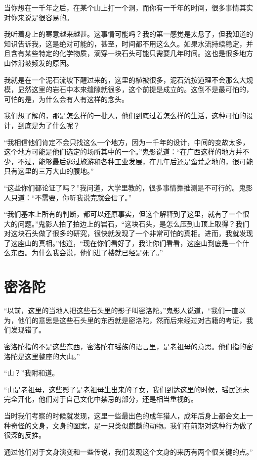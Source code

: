 当你想在一千年之后，在某个山上打一个洞，而你有一千年的时间，很多事情其实对你来说是很容易的。

我听着身上的寒意越来越甚。这事情可能吗？我的第一感觉是太悬了，但我知道的知识告诉我，这是绝对可能的，甚至，时间都不用这么久。如果水流持续稳定，并且含有某些特定的化学物质，滴穿一块石头可能只需要几年时间。这也是很多地方山体滑坡频发的原因。

我就是在一个泥石流坡下醒过来的，这里的植被很多，泥石流按道理不会那么大规模，显然这里的岩石中本来缝隙就很多，这个前提是成立的。这倒不是最可怕的，可怕的是，为什么会有人有这样的念头。

我们想了解的，那是怎么样的一批人，他们到底过着怎么样的生活，这种可怕的设计，到底是为了什么呢？

“我相信他们肯定不会只找这么一个地方，因为一千年的设计，中间的变故太多，这个地方可能是他们选定的场所其中的一个。”鬼影说道：“在广西这样的地方并不少，不过，能够最后逃过旅游和各种工业发展，在几年后还是蛮荒之地的，很可能只有这里的三万大山的腹地。”

“这些你们都论证了吗？”我问道，大学里教的，很多事情靠推测是不可行的。鬼影人只道：“不需要，你听我说完就会信了。”

“我们基本上所有的判断，都可以还原事实，但这个解释到了这里，就有了一个很大的问题。”鬼影人拍了拍边上的岩石，“这块石头，是怎么压到山顶上取得？我们对这块石头做了很多的研究，很快就发现了一个非常可怕的真相。进而，我就发现了这座山的真相。”他道，“现在你们看好了，我让你们看看，这座山到底是一个什么东西。为什么我会说，他们进了楼就已经是死了。”

\chapter{密洛陀}

“以前，这里的当地人把这些石头里的影子叫密洛陀。”鬼影人说道，“我们一直以为，他们的意思是这些石头里的东西就是密洛陀，然而后来经过对古籍的考证，我们发现错了。

密洛陀指的不是这些东西，密洛陀在瑶族的语言里，是老祖母的意思。他们指的密洛陀是这里整座的大山。”

“山？”我附和道。

“山是老祖母，这些影子是老祖母生出来的子女，我们到达这里的时候，瑶民还未完全开化，他们对于自己文化中禁忌的部分，还是相当重视的。

当时我们考察的时候就发现，这里一些最出色的成年猎人，成年后身上都会文上一种奇怪的文身，文身的图案，是一只类似麒麟的动物。我们在前期对这种行为做了很深的反推。

通过他们对于文身演变和一些传说，我们发现这个文身的来历有两个很关键的点。”

